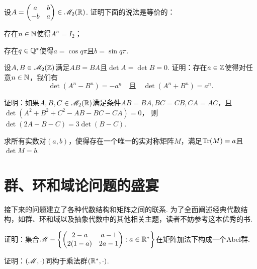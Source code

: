 \begin{problem}
  设$A=\begin{pmatrix}
    a & b \\
    -b & a
  \end{pmatrix}\in\mathscr M_2(\mathbb R)$. 证明下面的说法是等价的：
  \begin{enum}
    \item\label{prob1.45.a} 存在$n\in\mathbb N$使得$A^n=I_2$；
    \item\label{prob1.45.b} 存在$q\in\mathbb Q^\ast$使得$a=\cos q\pi$且$b=\sin q\pi$.
  \end{enum}
\end{problem}

\begin{problem}
  设$A,B\in\mathscr M_2(\mathbb Z)$满足$AB=BA$且$\det A=\det B=0$. 证明：存在$a\in\mathbb Z$使得对任意$n\in\mathbb N$，我们有
  \[
    \det(A^n-B^n) = -a^n\quad \text{且}\quad
    \det(A^n+B^n) = a^n.
  \]
\end{problem}

\begin{problem}
  证明：如果$A,B,C\in\mathscr M_2(\mathbb R)$满足条件$AB=BA,BC=CB,CA=AC$，且
  $\det(A^2+B^2+C^2-AB-BC-CA)=0$，
  则$\det(2A-B-C)=3\det(B-C)$.
\end{problem}

\begin{problem}
  \cite{60} 求所有实数对$(a,b)$，使得存在一个唯一的实对称矩阵$M$，满足$\operatorname{Tr}(M)=a$且$\det M=b$.
\end{problem}

\section{群、环和域论问题的盛宴}

接下来的问题建立了各种代数结构和矩阵之间的联系. 为了全面阐述经典代数结构，如群、环和域以及抽象代数中的其他相关主题，读者不妨参考这本优秀的书\cite{17}.
\begin{problem}
  \begin{enumerate*}[label=(\alph*),
      itemjoin=\\\hspace*{\parindent}]
    \item 证明：集合$\MM-\left\{\begin{pmatrix}
      2-a & a-1\\
      2(1-a) & 2a-1
    \end{pmatrix}:a\in\MR^\ast\right\}$在矩阵加法下构成一个Abel群.
    \item 证明：$(\mathscr M,\cdot)$同构于乘法群$(\mathbb R^\ast,\cdot)$.
  \end{enumerate*}
\end{problem}

